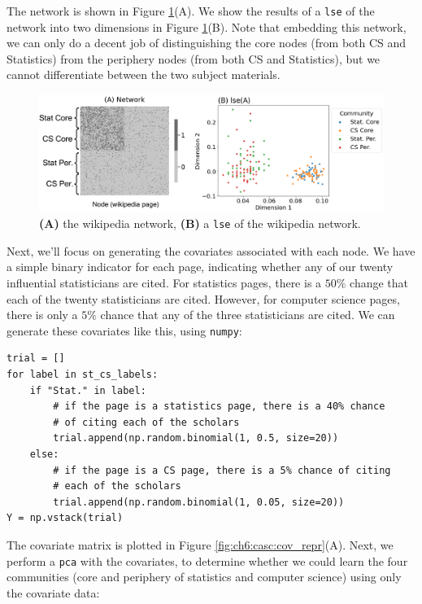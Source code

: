 The network is shown in Figure \ref{fig:ch6:casc:casc_net}(A). We show the results of a \texttt{lse} of the network into two dimensions in Figure \ref{fig:ch6:casc:casc_net}(B). Note that embedding this network, we can only do a decent job of distinguishing the core nodes (from both CS and Statistics) from the periphery nodes (from both CS and Statistics), but we cannot differentiate between the two subject materials.

\begin{figure}[h]
    \centering
    \includegraphics[width=\linewidth]{representations/ch6/Images/casc_net.png}
    \caption[\texttt{CASC} network]{\textbf{(A)} the wikipedia network, \textbf{(B)} a \texttt{lse} of the wikipedia network.}
    \label{fig:ch6:casc:casc_net}
\end{figure}

Next, we'll focus on generating the covariates associated with each node. We have a simple binary indicator for each page, indicating whether any of our twenty influential statisticians are cited. For statistics pages, there is a $50\%$ change that each of the twenty statisticians are cited. However, for computer science pages, there is only a $5\%$ chance that any of the three statisticians are cited. We can generate these covariates like this, using \texttt{numpy}:

\begin{lstlisting}[style=python]
trial = []
for label in st_cs_labels:
    if "Stat." in label:
        # if the page is a statistics page, there is a 40% chance
        # of citing each of the scholars
        trial.append(np.random.binomial(1, 0.5, size=20))
    else:
        # if the page is a CS page, there is a 5% chance of citing
        # each of the scholars
        trial.append(np.random.binomial(1, 0.05, size=20))
Y = np.vstack(trial)
\end{lstlisting}

The covariate matrix is plotted in Figure \ref{fig:ch6:casc:cov_repr}(A). Next, we perform a \texttt{pca} with the covariates, to determine whether we could learn the four communities (core and periphery of statistics and computer science) using only the covariate data:

